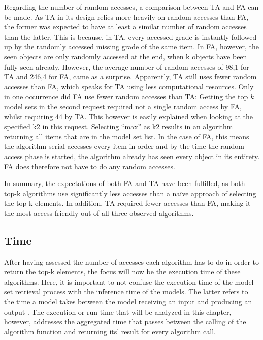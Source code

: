 Regarding the number of random accesses, a comparison between TA and FA can be made. As TA in its design relies more heavily on random accesses than FA, the former was expected to have at least a similar number of random accesses than the latter. This is because, in TA, every accessed grade is instantly followed up by the randomly accessed missing grade of the same item. In FA, however, the seen objects are only randomly accessed at the end, when k objects have been fully seen already. However, the average number of random accesses of 98,1 for TA and 246,4 for FA, came as a surprise. Apparently, TA still uses fewer random accesses than FA, which speaks for TA using less computational resources. Only in one occurrence did FA use fewer random accesses than TA: Getting the top $k$ model sets in the second request required not a single random access by FA, whilst requiring 44 by TA. This however is easily explained when looking at the specified k2 in this request. Selecting “max” as k2 results in an algorithm returning all items that are in the model set list. In the case of FA, this means the algorithm serial accesses every item in order and by the time the random access phase is started, the algorithm already has seen every object in its entirety. FA does therefore not have to do any random accesses.

In summary, the expectations of both FA and TA have been fulfilled, as both top-k algorithms use significantly less accesses than a naïve approach of selecting the top-k elements. In addition, TA required fewer accesses than FA, making it the most access-friendly out of all three observed algorithms. 



\subsection{Time}

After having assessed the number of accesses each algorithm has to do in order to return the top-k elements, the focus will now be the execution time of these algorithms. Here, it is important to not confuse the execution time of the model set retrieval process with the inference time of the models. The latter refers to the time a model takes between the model receiving an input and producing an output \cite{marco2019}. The execution or run time that will be analyzed in this chapter, however, addresses the aggregated time that passes between the calling of the algorithm function and returning its’ result for every algorithm call. 

